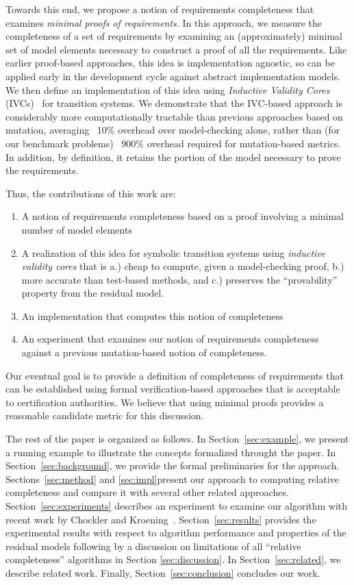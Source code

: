 \noindent Towards this end, we propose a notion of requirements completeness that examines {\em minimal proofs of requirements}.  In this approach, we measure the completeness of a set of requirements by examining an (approximately) minimal set of model elements necessary to construct a proof of all the requirements.  Like earlier proof-based approaches, this idea is implementation agnostic, so can be applied early in the development cycle against abstract implementation models.  We then define an implementation of this idea using {\em Inductive Validity Cores} (IVCs)~\cite{Ghass16} for transition systems.  We demonstrate that the IVC-based approach is considerably more computationally tractable than previous approaches based on mutation, averaging ~10\% overhead over model-checking alone, rather than (for our benchmark problems) ~900\% overhead required for mutation-based metrics.  In addition, by definition, it retains the portion of the model necessary to prove the requirements.

Thus, the contributions of this work are:
\begin{enumerate}
\item A notion of requirements completeness based on a proof involving a minimal number of model elements
\item A realization of this idea for symbolic transition systems using {\em inductive validity cores} that is a.) cheap to compute, given a model-checking proof, b.) more accurate than test-based methods, and c.) preserves the ``provability'' property from the residual model.
\item An implementation that computes this notion of completeness
\item An experiment that examines our notion of requirements completeness against a previous mutation-based notion of completeness.
\end{enumerate}

\noindent Our eventual goal is to provide a definition of completeness of requirements that can be established using formal verification-based approaches that is acceptable to certification authorities.  We believe that using minimal proofs provides a reasonable candidate metric for this discussion.


The rest of the paper is organized as follows.  In Section~\ref{sec:example}, we present a running example to illustrate the concepts formalized throught the paper.  In Section~\ref{sec:background}, we provide the formal preliminaries for the approach.  Sections~\ref{sec:method} and \ref{sec:impl}present our approach to computing relative completeness and compare it with several other related approaches.  Section~\ref{sec:experiments} describes an experiment to examine our algorithm with recent work by Chockler and Kroening~\cite{chockler2010coverage}. Section~\ref{sec:results} provides the experimental results with respect to algorithm performance and properties of the residual models following by a discussion on limitations of all ``relative completeness'' algorithms in Section \ref{sec:discussion}.  In Section~\ref{sec:related}, we describe related work.  Finally, Section~\ref{sec:conclusion} concludes our work.

